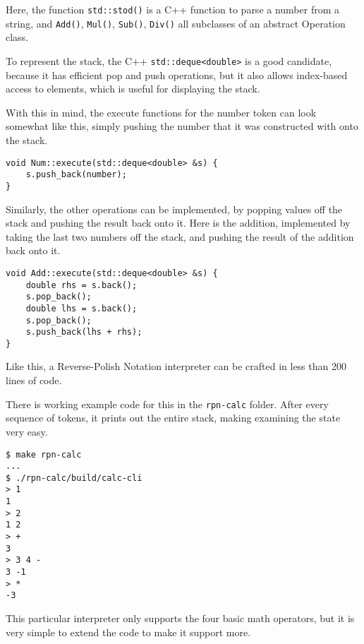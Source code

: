 \documentclass[a4paper,twocolumn]{article}
\begin{document}
Here, the function \verb|std::stod()| is a C++ function to parse a number from a string, and \verb|Add()|, \verb|Mul()|, \verb|Sub()|, \verb|Div()| all subclasses of an abstract Operation class.

To represent the stack, the C++ \verb|std::deque<double>| is a good candidate, because it has efficient pop and push operations, but it also allows index-based access to elements, which is useful for displaying the stack.

With this in mind, the execute functions for the number token can look somewhat like this, simply pushing the number that it was constructed with onto the stack.

\begin{verbatim}
void Num::execute(std::deque<double> &s) {                                                                                                                                                           
    s.push_back(number);                                                                                                                                                                                
}  
\end{verbatim}

Similarly, the other operations can be implemented, by popping values off the stack and pushing the result back onto it. Here is the addition, implemented by taking the last two numbers off the stack, and pushing the result of the addition back onto it.

\begin{verbatim}
void Add::execute(std::deque<double> &s) {
    double rhs = s.back();
    s.pop_back();
    double lhs = s.back();
    s.pop_back();
    s.push_back(lhs + rhs);
}  
\end{verbatim}

Like this, a Reverse-Polish Notation interpreter can be crafted in less than 200 lines of code. 

There is working example code for this in the \verb|rpn-calc| folder. After every sequence of tokens, it prints out the entire stack, making examining the state very easy.

\begin{verbatim}
$ make rpn-calc
...
$ ./rpn-calc/build/calc-cli
> 1
1
> 2
1 2
> +
3
> 3 4 -
3 -1
> *
-3
\end{verbatim}
This particular interpreter only supports the four basic math operators, but it is very simple to extend the code to make it support more.
\end{document}
